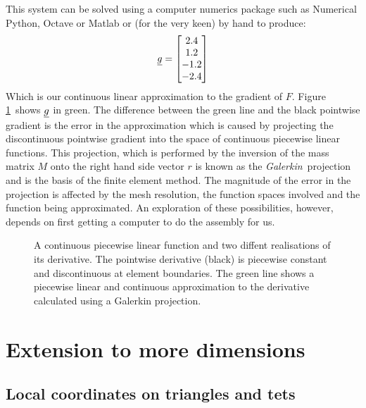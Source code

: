 \documentclass[a4paper, 11pt]{book}
\newcommand{\ifhtlatex}[2]{\ifthenelse{\boolean{HTLatex}}{#1}{#2}}
\newcommand{\xfig}[1]{
  \ifhtlatex{
    \texttt{[image: \#1.png]}
  }{
    
  }
}
\begin{document}
This system can be solved using a computer numerics package such as
Numerical Python, Octave or Matlab or (for the very keen) by hand to
produce:
\begin{equation}
  \underline{g}=
  \begin{bmatrix}
    2.4\\
    1.2\\
    -1.2\\
    -2.4
  \end{bmatrix}
\end{equation}
Which is our continuous linear approximation to the gradient of $F$. Figure
\ref{fig:1dpointdfdxgalerkin}\ shows $\underline{g}$ in green. The difference
between the green line and the black pointwise gradient is the error in the
approximation which is caused by projecting the discontinuous pointwise
gradient into the space of continuous piecewise linear functions. This
projection, which is performed by the inversion of the mass matrix $M$ onto
the right hand side vector $r$ is known as the \emph{Galerkin}\ projection
and is the basis of the finite element method. The magnitude of the error in
the projection is affected by the mesh resolution, the function spaces
involved and the function being approximated. An exploration of these
possibilities, however, depends on first getting a computer to do the
assembly for us.
\begin{figure}[t]
  \centering
  \xfig{linear_1d_galerkin}
  \caption{A continuous piecewise linear function and two diffent
    realisations of its derivative. The pointwise 
    derivative (black) is piecewise constant and discontinuous at element
    boundaries. The green line shows a piecewise linear and continuous
    approximation to the derivative calculated using a Galerkin projection.}
  \label{fig:1dpointdfdxgalerkin}
\end{figure}

\chapter{Extension to more dimensions}

\section{Local coordinates on triangles and tets}
\end{document}
